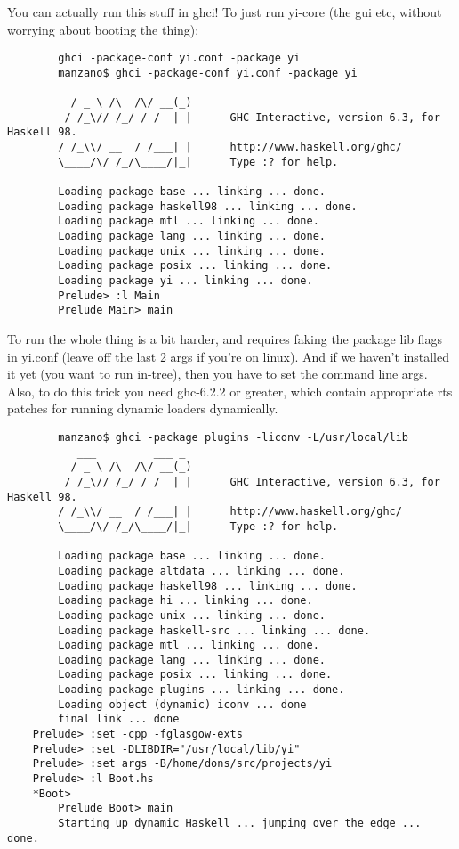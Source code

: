 You can actually run this stuff in ghci! To just run yi-core (the gui
etc, without worrying about booting the thing):

\begin{verbatim}
        ghci -package-conf yi.conf -package yi
        manzano$ ghci -package-conf yi.conf -package yi
           ___         ___ _
          / _ \ /\  /\/ __(_)
         / /_\// /_/ / /  | |      GHC Interactive, version 6.3, for Haskell 98.
        / /_\\/ __  / /___| |      http://www.haskell.org/ghc/
        \____/\/ /_/\____/|_|      Type :? for help.

        Loading package base ... linking ... done.
        Loading package haskell98 ... linking ... done.
        Loading package mtl ... linking ... done.
        Loading package lang ... linking ... done.
        Loading package unix ... linking ... done.
        Loading package posix ... linking ... done.
        Loading package yi ... linking ... done.
        Prelude> :l Main
        Prelude Main> main
\end{verbatim}

To run the whole thing is a bit harder, and requires faking the package
lib flags in yi.conf (leave off the last 2 args if you're on linux). And
if we haven't installed it yet (you want to run in-tree), then you have
to set the command line args. Also, to do this trick you need ghc-6.2.2
or greater, which contain appropriate rts patches for running dynamic
loaders dynamically.

\begin{verbatim}
        manzano$ ghci -package plugins -liconv -L/usr/local/lib
           ___         ___ _
          / _ \ /\  /\/ __(_)
         / /_\// /_/ / /  | |      GHC Interactive, version 6.3, for Haskell 98.
        / /_\\/ __  / /___| |      http://www.haskell.org/ghc/
        \____/\/ /_/\____/|_|      Type :? for help.

        Loading package base ... linking ... done.
        Loading package altdata ... linking ... done.
        Loading package haskell98 ... linking ... done.
        Loading package hi ... linking ... done.
        Loading package unix ... linking ... done.
        Loading package haskell-src ... linking ... done.
        Loading package mtl ... linking ... done.
        Loading package lang ... linking ... done.
        Loading package posix ... linking ... done.
        Loading package plugins ... linking ... done.
        Loading object (dynamic) iconv ... done
        final link ... done
	Prelude> :set -cpp -fglasgow-exts
	Prelude> :set -DLIBDIR="/usr/local/lib/yi"
	Prelude> :set args -B/home/dons/src/projects/yi
	Prelude> :l Boot.hs
	*Boot>
        Prelude Boot> main
        Starting up dynamic Haskell ... jumping over the edge ... done.
\end{verbatim}

